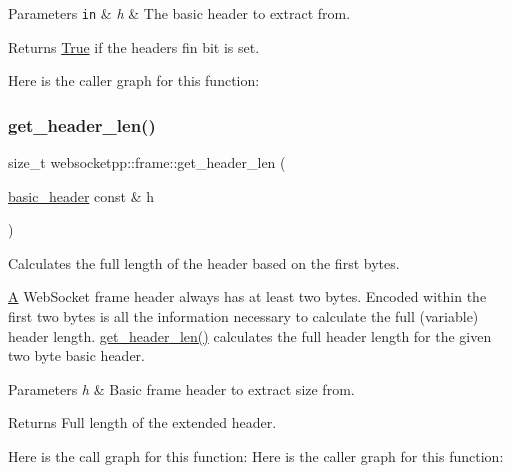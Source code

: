 \begin{DoxyParams}[1]{Parameters}
\mbox{\tt in}  & {\em h} & The basic header to extract from. \\
\hline
\end{DoxyParams}
\begin{DoxyReturn}{Returns}
\mbox{\hyperlink{struct_true}{True}} if the header\textquotesingle{}s fin bit is set. 
\end{DoxyReturn}
Here is the caller graph for this function\+:
\mbox{\label{namespacewebsocketpp_1_1frame_abd4f23c906cc48fb3b34603fd4284b01}} 
\subsubsection{\texorpdfstring{get\+\_\+header\+\_\+len()}{get\_header\_len()}}
{\footnotesize\ttfamily size\+\_\+t websocketpp\+::frame\+::get\+\_\+header\+\_\+len (\begin{DoxyParamCaption}\item[{\mbox{\hyperlink{structwebsocketpp_1_1frame_1_1basic__header}{basic\+\_\+header}} const \&}]{h }\end{DoxyParamCaption})\hspace{0.3cm}{\ttfamily [inline]}}



Calculates the full length of the header based on the first bytes. 

\mbox{\hyperlink{struct_a}{A}} Web\+Socket frame header always has at least two bytes. Encoded within the first two bytes is all the information necessary to calculate the full (variable) header length. \mbox{\hyperlink{namespacewebsocketpp_1_1frame_abd4f23c906cc48fb3b34603fd4284b01}{get\+\_\+header\+\_\+len()}} calculates the full header length for the given two byte basic header.


\begin{DoxyParams}{Parameters}
{\em h} & Basic frame header to extract size from. \\
\hline
\end{DoxyParams}
\begin{DoxyReturn}{Returns}
Full length of the extended header. 
\end{DoxyReturn}
Here is the call graph for this function\+:
Here is the caller graph for this function\+:
\mbox{\label{namespacewebsocketpp_1_1frame_ac55b672bcd3baf4c5a074816f6eb035b}} 
